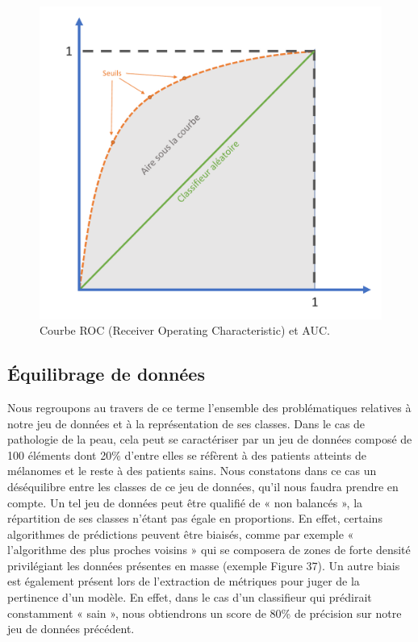 \begin{figure}[H]
    \centering
    \includegraphics[width=\linewidth]{contents/chapter_3/resources/roc_curve.pdf}
    \caption{Courbe ROC (Receiver Operating Characteristic) et AUC.}
    \label{fig:roc_curve}
\end{figure}

\subsection{Équilibrage de données}
Nous regroupons au travers de ce terme l’ensemble des problématiques relatives à notre jeu de données et à la représentation de ses classes. Dans le cas de pathologie de la peau, cela peut se caractériser par un jeu de données composé de 100 éléments dont 20\% d’entre elles se réfèrent à des patients atteints de mélanomes et le reste à des patients sains. Nous constatons dans ce cas un déséquilibre entre les classes de ce jeu de données, qu’il nous faudra prendre en compte. Un tel jeu de données peut être qualifié de « non balancés », la répartition de ses classes n’étant pas égale en proportions.
En effet, certains algorithmes de prédictions peuvent être biaisés, comme par exemple « l’algorithme des plus proches voisins » qui se composera de zones de forte densité privilégiant les données présentes en masse (exemple Figure 37). Un autre biais est également présent lors de l’extraction de métriques pour juger de la pertinence d’un modèle. En effet, dans le cas d’un classifieur qui prédirait constamment « sain », nous obtiendrons un score de 80\% de précision sur notre jeu de données précédent.
  
